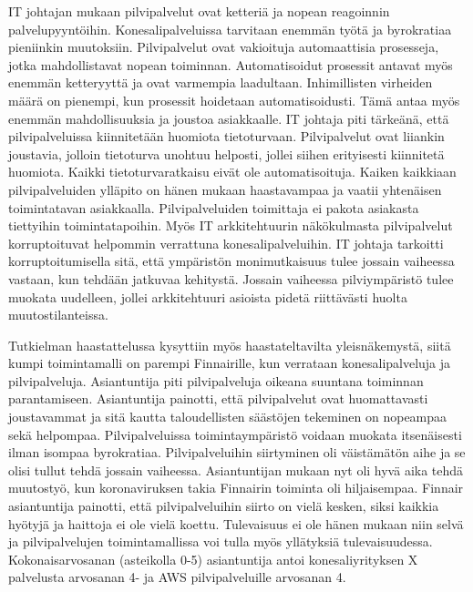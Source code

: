IT johtajan mukaan pilvipalvelut ovat ketteriä ja nopean reagoinnin palvelupyyntöihin. Konesalipalveluissa tarvitaan enemmän työtä ja byrokratiaa pieniinkin muutoksiin. Pilvipalvelut ovat vakioituja automaattisia prosesseja, jotka mahdollistavat nopean toiminnan. Automatisoidut prosessit antavat myös enemmän ketteryyttä ja ovat varmempia laadultaan. Inhimillisten virheiden määrä on pienempi, kun prosessit hoidetaan automatisoidusti. Tämä antaa myös enemmän mahdollisuuksia ja joustoa asiakkaalle. IT johtaja piti tärkeänä, että pilvipalveluissa kiinnitetään huomiota tietoturvaan. Pilvipalvelut ovat liiankin joustavia, jolloin tietoturva unohtuu helposti, jollei siihen erityisesti kiinnitetä huomiota. Kaikki tietoturvaratkaisu eivät ole automatisoituja. Kaiken kaikkiaan pilvipalveluiden ylläpito on hänen mukaan haastavampaa ja vaatii yhtenäisen toimintatavan asiakkaalla. Pilvipalveluiden toimittaja ei pakota asiakasta tiettyihin toimintatapoihin. Myös IT arkkitehtuurin näkökulmasta pilvipalvelut korruptoituvat helpommin verrattuna konesalipalveluihin. IT johtaja tarkoitti korruptoitumisella sitä, että ympäristön monimutkaisuus tulee jossain vaiheessa vastaan, kun tehdään jatkuvaa kehitystä. Jossain vaiheessa pilviympäristö tulee muokata uudelleen, jollei arkkitehtuuri asioista pidetä riittävästi huolta muutostilanteissa.  

Tutkielman haastattelussa kysyttiin myös haastateltavilta yleisnäkemystä, siitä kumpi toimintamalli on parempi Finnairille, kun verrataan konesalipalveluja ja pilvipalveluja. Asiantuntija piti pilvipalveluja oikeana suuntana toiminnan parantamiseen. Asiantuntija painotti, että pilvipalvelut ovat huomattavasti joustavammat ja sitä kautta taloudellisten säästöjen tekeminen on nopeampaa sekä helpompaa. Pilvipalveluissa toimintaympäristö voidaan muokata itsenäisesti ilman isompaa byrokratiaa. Pilvipalveluihin siirtyminen oli väistämätön aihe ja se olisi tullut tehdä jossain vaiheessa. Asiantuntijan mukaan nyt oli hyvä aika tehdä muutostyö, kun koronaviruksen takia Finnairin toiminta oli hiljaisempaa. Finnair asiantuntija painotti, että pilvipalveluihin siirto on vielä kesken, siksi kaikkia hyötyjä ja haittoja ei ole vielä koettu. Tulevaisuus ei ole hänen mukaan niin selvä ja pilvipalvelujen toimintamallissa voi tulla myös yllätyksiä tulevaisuudessa. Kokonaisarvosanan (asteikolla 0-5) asiantuntija antoi konesaliyrityksen X palvelusta arvosanan 4- ja AWS pilvipalveluille arvosanan 4.

